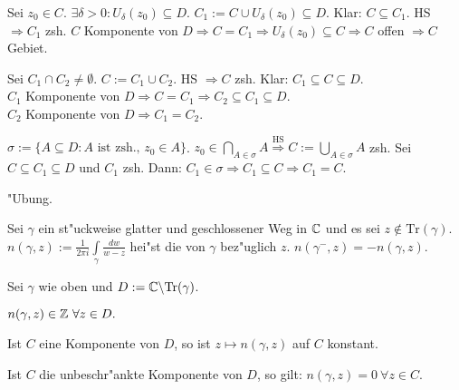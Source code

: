 \documentclass[a4paper,twoside,DIV15,BCOR12mm]{scrbook}
\def\Tr{\text{Tr}}
\def\wegint{\ensuremath{\int\limits_\gamma}}
\begin{document}
\begin{beweis}
\begin{liste}
\item Sei $z_0 \in C$. $\exists \delta > 0: U_{\delta}(z_0) \subseteq D$. $C_1:=C \cup U_{\delta}(z_0) \subseteq D$. Klar: $C \subseteq C_1.$ HS $\Rightarrow C_1$ zsh. $C$ Komponente von $D \Rightarrow C=C_1 \Rightarrow U_{\delta}(z_0) \subseteq C \Rightarrow C$ offen $\Rightarrow C$ Gebiet.
\item Sei $C_1 \cap C_2 \not= \emptyset$. $C:=C_1 \cup C_2$. HS $\Rightarrow C$ zsh. Klar: $C_1 \subseteq C \subseteq D$.\\
$C_1$ Komponente von $D \Rightarrow C=C_1 \Rightarrow C_2 \subseteq C_1 \subseteq D$. \\
$C_2$ Komponente von $D \Rightarrow C_1 = C_2$.
\item $\sigma := \{ A \subseteq D: A\text{ ist zsh., } z_0 \in A \}$. $z_0 \in \bigcap_{A \in \sigma}A \stackrel{\mbox{HS}}{\Rightarrow} C:= \bigcup_{A \in \sigma} A$ zsh. Sei $C \subseteq C_1 \subseteq D$ und $C_1$ zsh. Dann: $C_1 \in \sigma \Rightarrow C_1 \subseteq C \Rightarrow C_1 = C$.
\item "Ubung.
\end{liste}
\end{beweis}

\begin{definition}
Sei $\gamma$ ein st"uckweise glatter und geschlossener Weg in $\mathbb{C}$ und es sei $z \notin \Tr(\gamma)$. $n(\gamma,z):= \frac1{2\pi i} \wegint \frac{dw}{w-z}$ hei"st die  von $\gamma$ bez"uglich $z$. $n(\gamma^-,z) = -n(\gamma,z)$.
\end{definition}

\begin{satz}
Sei $\gamma$ wie oben und $D:= \MdC \backslash \Tr(\gamma)$.
\begin{liste}
\item $n(\gamma,z) \in \mathbb{Z} \ \forall z \in D.$
\item Ist $C$ eine Komponente von $D$, so ist $z \mapsto n(\gamma,z)$ auf $C$ konstant.
\item Ist $C$ die unbeschr"ankte Komponente von $D$, so gilt: $n(\gamma,z) = 0 \ \forall z \in C.$
\end{liste}
\end{satz}
\end{document}
